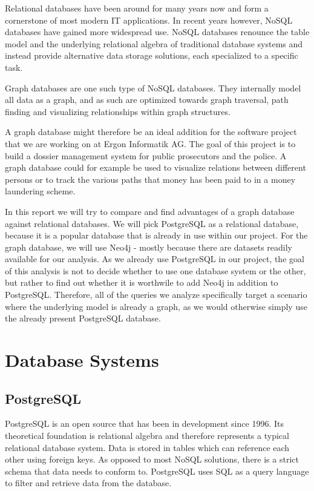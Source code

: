 \documentclass[11pt, a4paper,oneside,chapterprefix=false]{scrbook}
\begin{document}
Relational databases have been around for many years now and form a cornerstone of most modern IT applications.
In recent years however, NoSQL databases have gained more widespread use.
NoSQL databases renounce the table model and the underlying relational algebra of traditional database systems and instead provide alternative data storage solutions, each specialized to a specific task.

Graph databases are one such type of NoSQL databases.
They internally model all data as a graph, and as such are optimized towards graph traversal, path finding and visualizing relationships within graph structures.

A graph database might therefore be an ideal addition for the software project that we are working on at Ergon Informatik AG.
The goal of this project is to build a dossier management system for public prosecutors and the police.
A graph database could for example be used to visualize relations between different persons or to track the various paths that money has been paid to in a money laundering scheme.

In this report we will try to compare and find advantages of a graph database against relational databases.
We will pick PostgreSQL as a relational database, because it is a popular database that is already in use within our project.
For the graph database, we will use Neo4j - mostly because there are datasets readily available for our analysis.
As we already use PostgreSQL in our project, the goal of this analysis is not to decide whether to use one database system or the other, but rather to find out whether it is worthwile to add Neo4j in addition to PostgreSQL.
Therefore, all of the queries we analyze specifically target a scenario where the underlying model is already a graph, as we would otherwise simply use the already present PostgreSQL database.

\chapter{Database Systems} \label{chp:theory}

\section{PostgreSQL}
PostgreSQL \cite{postgres} is an open source that has been in development since 1996.
Its theoretical foundation is relational algebra \cite{relationalalgebra} and therefore represents a typical relational database system.
Data is stored in tables which can reference each other using foreign keys.
As opposed to most NoSQL solutions, there is a strict schema that data needs to conform to.
PostgreSQL uses SQL as a query language to filter and retrieve data from the database.
\end{document}
